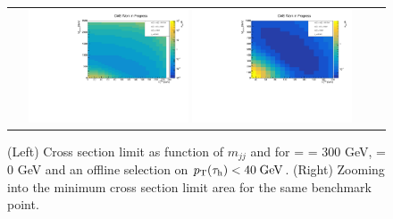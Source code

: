 \begin{figure}[tbh!]
	\centering
	\begin{tabular}{cc}
		\includegraphics[width=0.45\textwidth]{analysis/pics/JetInvMass_vs_MET_xsec_chi300_lsp000_taupt40.pdf}
		\includegraphics[width=0.45\textwidth]{analysis/pics/JetInvMass_vs_MET_xsec_chi300_lsp000_taupt40_zoom.pdf} 		
	\end{tabular}
	\caption{(Left) Cross section limit as function of $m_{jj}$ and \met for \charginopm = \neutralinotwo = 300 GeV, \neutralinoone = 0 GeV and an offline selection on $p_{\text{T}}(\tau_{\text{h}}) <  40\;\text{Ge}\kern-0.06667em\text{V}$. (Right) Zooming into the minimum cross section limit area for the same benchmark point.}
	\label{fig::JetInvMass_vs_MET_xsec_chi300_lsp000_taupt40}
\end{figure}

